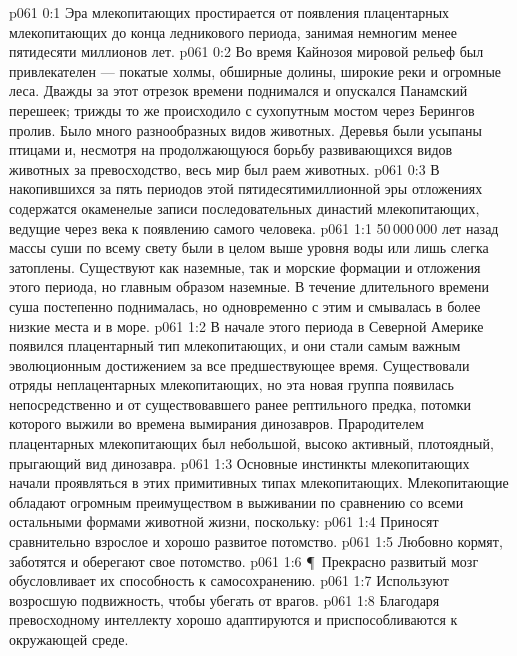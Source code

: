 \vs p061 0:1 Эра млекопитающих простирается от появления плацентарных млекопитающих до конца ледникового периода, занимая немногим менее пятидесяти миллионов лет.
\vs p061 0:2 Во время Кайнозоя мировой рельеф был привлекателен --- покатые холмы, обширные долины, широкие реки и огромные леса. Дважды за этот отрезок времени поднимался и опускался Панамский перешеек; трижды то же происходило с сухопутным мостом через Берингов пролив. Было много разнообразных видов животных. Деревья были усыпаны птицами и, несмотря на продолжающуюся борьбу развивающихся видов животных за превосходство, весь мир был раем животных.
\vs p061 0:3 В накопившихся за пять периодов этой пятидесятимиллионной эры отложениях содержатся окаменелые записи последовательных династий млекопитающих, ведущие через века к появлению самого человека.
\vs p061 1:1 50\,000\,000 лет назад массы суши по всему свету были в целом выше уровня воды или лишь слегка затоплены. Существуют как наземные, так и морские формации и отложения этого периода, но главным образом наземные. В течение длительного времени суша постепенно поднималась, но одновременно с этим и смывалась в более низкие места и в море.
\vs p061 1:2 В начале этого периода в Северной Америке  появился плацентарный тип млекопитающих, и они стали самым важным эволюционным достижением за все предшествующее время. Существовали отряды неплацентарных млекопитающих, но эта новая группа появилась непосредственно и  от существовавшего ранее рептильного предка, потомки которого выжили во времена вымирания динозавров. Прародителем плацентарных млекопитающих был небольшой, высоко активный, плотоядный, прыгающий вид динозавра.
\vs p061 1:3 Основные инстинкты млекопитающих начали проявляться в этих примитивных типах млекопитающих. Млекопитающие обладают огромным преимуществом в выживании по сравнению со всеми остальными формами животной жизни, поскольку:
\vs p061 1:4 \bibnobreakspace Приносят сравнительно взрослое и хорошо развитое потомство.
\vs p061 1:5 \bibnobreakspace Любовно кормят, заботятся и оберегают свое потомство.
\vs p061 1:6 \P\ \bibnobreakspace Прекрасно развитый мозг обусловливает их способность к самосохранению.
\vs p061 1:7 \bibnobreakspace Используют возросшую подвижность, чтобы убегать от врагов.
\vs p061 1:8 \bibnobreakspace Благодаря превосходному интеллекту хорошо адаптируются и приспособливаются к окружающей среде.
